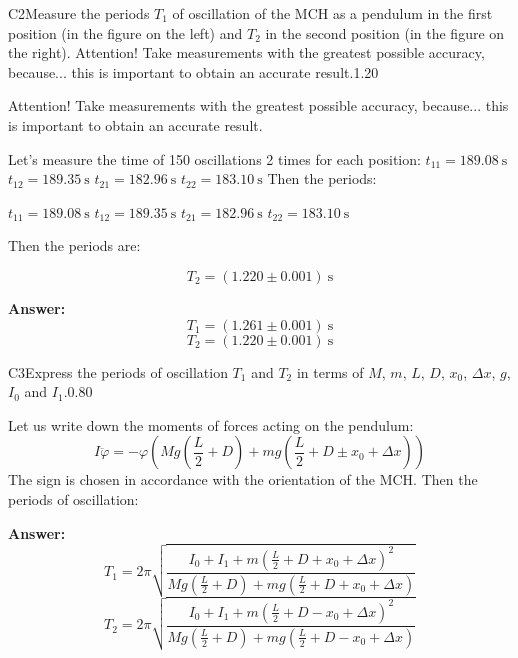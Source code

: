 \documentclass[11pt,a4paper]{article}
\begin{document}
\begin{solcard}{C2}{Measure the periods $T_1$ of oscillation of the MCH as a pendulum in the first position (in the figure on the left) and $T_2$ in the second position (in the figure on the right). Attention! Take measurements with the greatest possible accuracy, because... this is important to obtain an accurate result.}{1.20}

Attention! Take measurements with the greatest possible accuracy, because... this is important to obtain an accurate result.


Let's measure the time of 150 oscillations 2 times for each position: $t_{11} = 189.08~\mathrm{s}$ $t_{12} = 189.35~\mathrm{s}$ $t_{21} = 182.96~\mathrm{s}$ $t_{22} = 183.10~\mathrm{s}$ Then the periods:


$t_{11} = 189.08~\mathrm{s}$ $t_{12} = 189.35~\mathrm{s}$ $t_{21} = 182.96~\mathrm{s}$ $t_{22} = 183.10~\mathrm{s}$


Then the periods are:


$$T_2 = (1.220 \pm 0.001)~\mathrm{s}$$

\par\smallskip\noindent\textbf{Answer:} $$T_1 = (1.261 \pm 0.001)~\mathrm{s}$$ $$T_2 = (1.220 \pm 0.001)~\mathrm{s}$$
\end{solcard}

\begin{solcard}{C3}{Express the periods of oscillation $T_1$ and $T_2$ in terms of $M$, $m$, $L$, $D$, $x_0$, $\Delta x$, $g$, $I_0$ and $I_1$.}{0.80}

Let us write down the moments of forces acting on the pendulum: $$I\ddot{\varphi} = -\varphi\left(Mg\left(\frac{L}{2}+D\right)+mg\left(\frac{L}{2}+D\pm x_0+\Delta x\right)\right)$$The sign is chosen in accordance with the orientation of the MCH. Then the periods of oscillation:

\par\smallskip\noindent\textbf{Answer:} $$T_1 = 2\pi \sqrt{\frac{I_0+I_1+m\left(\frac{L}{2}+D+x_0+\Delta x\right)^2}{Mg\left(\frac{L}{2}+D\right)+mg\left(\frac{L}{2}+D+ x_0+\Delta x\right)}}$$$$T_2 = 2\pi \sqrt{\frac{I_0+I_1+m\left(\frac{L}{2}+D-x_0+\Delta x\right)^2}{Mg\left(\frac{L}{2}+D\right)+mg\left(\frac{L}{2}+D- x_0+\Delta x\right)}}$$
\end{solcard}
\end{document}

